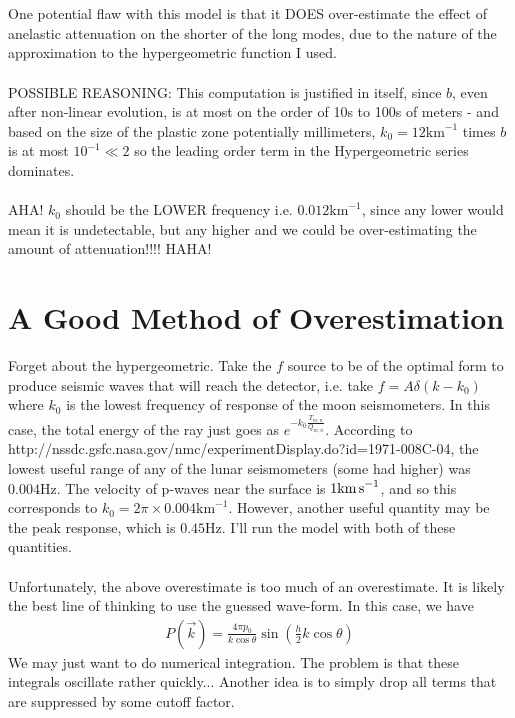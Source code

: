 \documentclass{article}
\newcommand*\te[1]{\text{#1}}
\newcommand*\p[1]{\left(#1\right)}
\newcommand*\f[2]{\frac{#1}{#2}}
\begin{document}
\\\\
One potential flaw with this model is that it DOES over-estimate the effect of anelastic attenuation on the shorter of the long modes, due to the nature of the approximation to the hypergeometric function I used.
\\\\
POSSIBLE REASONING: This computation is justified in itself, since $b$, even after non-linear evolution, is at most on the order of 10s to 100s of meters - and based on the size of the plastic zone potentially millimeters, $k_0 = 12\te{km}^{-1}$ times $b$ is at most $10^{-1}\ll 2$ so the leading order term in the Hypergeometric series dominates.
\\\\
AHA! $k_0$ should be the LOWER frequency i.e. $0.012\te{km}^{-1}$, since any lower would mean it is undetectable, but any higher and we could be over-estimating the amount of attenuation!!!! HAHA!
\pagebreak
\section{A Good Method of Overestimation}
Forget about the hypergeometric. Take the $f$ source to be of the optimal form to produce seismic waves that will reach the detector, i.e. take $f= A\delta(k-k_0)$ where $k_0$ is the lowest frequency of response of the moon seismometers. In this case, the total energy of the ray just goes as $e^{-k_0\f{T_{m,n}}{Q_{m,n}}}$. According to http://nssdc.gsfc.nasa.gov/nmc/experimentDisplay.do?id=1971-008C-04, the lowest useful range of any of the lunar seismometers (some had higher) was $0.004\te{Hz}$. The velocity of p-waves near the surface is $1\te{km\,s}^{-1}$, and so this corresponds to $k_0 = 2\pi\times 0.004\te{km}^{-1}$. However, another useful quantity may be the peak response, which is $0.45\te{Hz}$. I'll run the model with both of these quantities.
\\\\
Unfortunately, the above overestimate is too much of an overestimate. It is likely the best line of thinking to use the guessed wave-form. In this case, we have
\begin{align}
P(\vec k) = \f{4\pi p_0}{k\cos\theta}\sin\p{\f{h}{2}k\cos\theta}
\end{align}
We may just want to do numerical integration. The problem is that these integrals oscillate rather quickly... Another idea is to simply drop all terms that are suppressed by some cutoff factor.
\pagebreak
\end{document}
